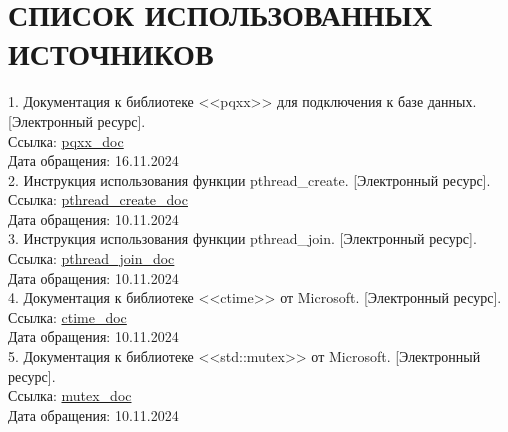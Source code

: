 \chapter*{\centering СПИСОК ИСПОЛЬЗОВАННЫХ ИСТОЧНИКОВ}

\hspace{-1.25cm}
1. Документация к библиотеке <<pqxx>> для подключения к базе данных. [Электронный ресурс]. \\
Ссылка:
\href{https://www.postgresql.org/docs/7.2/libpqplusplus.html} {pqxx\_doc} \\
Дата обращения: 16.11.2024 \\

\hspace{-1.25cm}
2. Инструкция использования функции pthread\_create. [Электронный ресурс]. \\
Ссылка:
\href{https://www.ibm.com/docs/en/zos/2.2.0?topic=functions-pthread-create-create-thread} {pthread\_create\_doc} \\
Дата обращения: 10.11.2024 \\

\hspace{-1.25cm}
3. Инструкция использования функции pthread\_join. [Электронный ресурс]. \\
Ссылка:
\href{https://www.ibm.com/docs/en/zos/2.4.0?topic=functions-pthread-join-wait-thread-end} {pthread\_join\_doc} \\
Дата обращения: 10.11.2024 \\

\hspace{-1.25cm}
4. Документация к библиотеке <<ctime>> от Microsoft. [Электронный ресурс]. \\
Ссылка:
\href{https://learn.microsoft.com/ru-ru/cpp/standard-library/ctime?view=msvc-170} {ctime\_doc} \\
Дата обращения: 10.11.2024 \\

\hspace{-1.25cm}
5. Документация к библиотеке <<std::mutex>> от Microsoft. [Электронный ресурс]. \\
Ссылка:
\href{https://learn.microsoft.com/ru-ru/cpp/standard-library/mutex?view=msvc-170} {mutex\_doc} \\
Дата обращения: 10.11.2024 \\